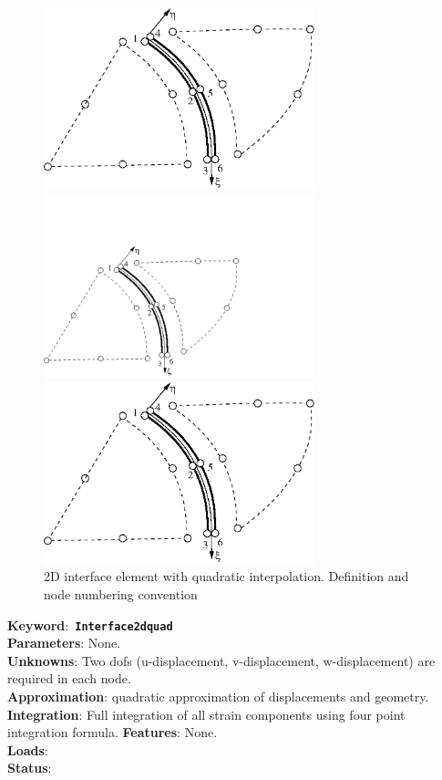 \documentclass[a4paper]{article}
\newcommand{\descitem}[1]{{\noindent \bf #1}:}
\newcommand{\elemkeyword}[1]{\descitem{Keyword}~{\bf \texttt{#1}}}
\begin{document}
\begin{figure}[tb]
\begin{htmlonly}
  \centerline{\includegraphics[width=0.7\textwidth]{interf2d_quad.eps}}
\end{htmlonly}
\ifpdf
 \centerline{\includegraphics[width=0.7\textwidth]{interf2d_quad.pdf}}
\else
 \centerline{\includegraphics[width=0.7\textwidth]{interf2d_quad.eps}}
\fi
\caption{2D interface element with quadratic interpolation. Definition and node numbering convention}
\label{interf2d_quad_fig}
\end{figure}

\elemkeyword{Interface2dquad}\\
\descitem{Parameters} None.\\
\descitem{Unknowns}
Two dofs (u-displacement, v-displacement, w-displacement) are required in each node.\\
\descitem{Approximation} quadratic approximation of displacements and
geometry.
\descitem{Integration}
Full integration of all strain components using four point integration formula.
\descitem{Features} None.\\
\descitem{Loads} \\
\descitem{Status} 
\end{document}
